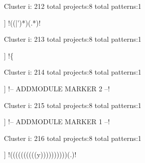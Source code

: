 Cluster i: 212
total projects:8
total patterns:1
\begin{multicols}{1}
\begin{description}[noitemsep,topsep=0pt]
\item [[8] ] \cverb!\*(\w(\w|')*)\*(.*)!
\end{description}
\end{multicols}







Cluster i: 213
total projects:8
total patterns:1
\begin{multicols}{1}
\begin{description}[noitemsep,topsep=0pt]
\item [[8] ] \cverb!\{%
\end{description}
\end{multicols}







Cluster i: 214
total projects:8
total patterns:1
\begin{multicols}{1}
\begin{description}[noitemsep,topsep=0pt]
\item [[8] ] \cverb!-- ADDMODULE MARKER 2 --!
\end{description}
\end{multicols}







Cluster i: 215
total projects:8
total patterns:1
\begin{multicols}{1}
\begin{description}[noitemsep,topsep=0pt]
\item [[8] ] \cverb!-- ADDMODULE MARKER 1 --!
\end{description}
\end{multicols}







Cluster i: 216
total projects:8
total patterns:1
\begin{multicols}{1}
\begin{description}[noitemsep,topsep=0pt]
\item [[8] ] \cverb!((((((((((y))))))))))(.)!
\end{description}
\end{multicols}







